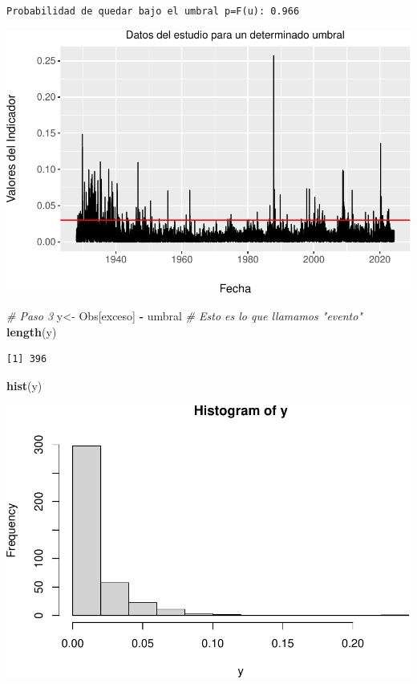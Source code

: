 \documentclass[
  12pt]{article}
\newenvironment{Shaded}{\begin{snugshade}}{\end{snugshade}}
\newcommand{\CommentTok}[1]{\textcolor[rgb]{0.56,0.35,0.01}{\textit{#1}}}
\newcommand{\FunctionTok}[1]{\textcolor[rgb]{0.13,0.29,0.53}{\textbf{#1}}}
\newcommand{\NormalTok}[1]{#1}
\newcommand{\OtherTok}[1]{\textcolor[rgb]{0.56,0.35,0.01}{#1}}
\newcommand{\SpecialCharTok}[1]{\textcolor[rgb]{0.81,0.36,0.00}{\textbf{#1}}}
\begin{document}
\begin{verbatim}
Probabilidad de quedar bajo el umbral p=F(u): 0.966 
\end{verbatim}

\includegraphics{Entrega_files/figure-latex/unnamed-chunk-32-1.pdf}

\begin{Shaded}
\begin{Highlighting}[]
\CommentTok{\# Paso 3}
\NormalTok{y}\OtherTok{\textless{}{-}}\NormalTok{ Obs[exceso] }\SpecialCharTok{{-}}\NormalTok{ umbral }\CommentTok{\# Esto es lo que llamamos "evento"}
\FunctionTok{length}\NormalTok{(y)}
\end{Highlighting}
\end{Shaded}

\begin{verbatim}
[1] 396
\end{verbatim}

\begin{Shaded}
\begin{Highlighting}[]
\FunctionTok{hist}\NormalTok{(y)}
\end{Highlighting}
\end{Shaded}

\includegraphics{Entrega_files/figure-latex/unnamed-chunk-34-1.pdf}
\end{document}
